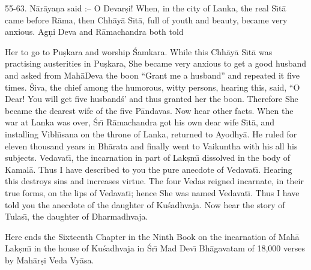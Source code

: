 55-63. N\=ar\=aya\d{n}a said :-- O Devar\d{s}i! When, in the city of Lanka, the real S\={\i}t\=a came before R\=ama, then Chh\=ay\=a S\={\i}t\=a, full of youth and beauty, became very anxious. Ag\d{n}i Deva and R\=amachandra both told

Her to go to Pu\d{s}kara and worship \'Samkara. While this Chh\=ay\=a S\={\i}t\=a was practising austerities in Pu\d{s}kara, She became very anxious to get a good husband and asked from Mah\=aDeva the boon ``Grant me a husband'' and repeated it five times. \'Siva, the chief among the humorous, witty persons, hearing this, said, ``O Dear! You will get five husband\'s' and thus granted her the boon. Therefore She became the dearest wife of the five P\=andavas. Now hear other facts. When the war at Lanka was over, \'Sr\={\i} R\=amachandra got his own dear wife S\={\i}t\=a, and installing Vibh\={\i}sana on the throne of Lanka, returned to Ayodhy\=a. He ruled for eleven thousand years in Bh\=arata and finally went to Vaikuntha with his all his subjects. Vedavat\={\i}, the incarnation in part of Lak\d{s}m\={\i} dissolved in the body of Kamal\=a. Thus I have described to you the pure anecdote of Vedavat\={\i}. Hearing this destroys sins and increases virtue. The four Vedas reigned incarnate, in their true forms, on the lips of Vedavat\={\i}; hence She was named Vedavat\={\i}. Thus I have told you the anecdote of the daughter of Ku\'sadhvaja. Now hear the story of Tulas\={\i}, the daughter of Dharmadhvaja.

Here ends the Sixteenth Chapter in the Ninth Book on the incarnation of Mah\=a Lak\d{s}m\={\i} in the house of Ku\'sadhvaja in \'Sr\={\i} Mad Dev\={\i} Bh\=agavatam of 18,000 verses by Mah\=ar\d{s}i Veda Vy\=asa.



